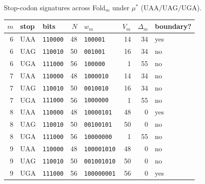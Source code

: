 Stop-codon signatures across Fold$_m$ under $\mu^\ast$ ($\mathrm{UAA/UAG/UGA}$).

\begin{center}
\small
\setlength{\tabcolsep}{6pt}
\renewcommand{\arraystretch}{1.15}
\begin{tabular}{r l l r l r r l}
\toprule
$m$ & stop & bits & $N$ & $w_m$ & $V_m$ & $\Delta_m$ & boundary? \\
\midrule
6 & $\mathrm{UAA}$ & \texttt{110000} & 48 & \texttt{100001} & 14 & 34 & yes \\
6 & $\mathrm{UAG}$ & \texttt{110010} & 50 & \texttt{001001} & 16 & 34 & no \\
6 & $\mathrm{UGA}$ & \texttt{111000} & 56 & \texttt{100000} & 1 & 55 & no \\
7 & $\mathrm{UAA}$ & \texttt{110000} & 48 & \texttt{1000010} & 14 & 34 & no \\
7 & $\mathrm{UAG}$ & \texttt{110010} & 50 & \texttt{0010010} & 16 & 34 & no \\
7 & $\mathrm{UGA}$ & \texttt{111000} & 56 & \texttt{1000000} & 1 & 55 & no \\
8 & $\mathrm{UAA}$ & \texttt{110000} & 48 & \texttt{10000101} & 48 & 0 & yes \\
8 & $\mathrm{UAG}$ & \texttt{110010} & 50 & \texttt{00100101} & 50 & 0 & no \\
8 & $\mathrm{UGA}$ & \texttt{111000} & 56 & \texttt{10000000} & 1 & 55 & no \\
9 & $\mathrm{UAA}$ & \texttt{110000} & 48 & \texttt{100001010} & 48 & 0 & no \\
9 & $\mathrm{UAG}$ & \texttt{110010} & 50 & \texttt{001001010} & 50 & 0 & no \\
9 & $\mathrm{UGA}$ & \texttt{111000} & 56 & \texttt{100000001} & 56 & 0 & yes \\
\bottomrule
\end{tabular}
\end{center}

